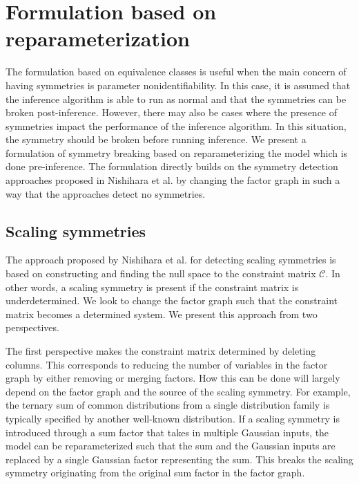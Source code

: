

\section{Formulation based on reparameterization}

The formulation based on equivalence classes is useful when the main concern of having symmetries is parameter nonidentifiability. In this case, it is assumed that the inference algorithm is able to run as normal and that the symmetries can be broken post-inference. However, there may also be cases where the presence of symmetries impact the performance of the inference algorithm. In this situation, the symmetry should be broken before running inference. We present a formulation of symmetry breaking based on reparameterizing the model which is done pre-inference. The formulation directly builds on the symmetry detection approaches proposed in Nishihara et al. by changing the factor graph in such a way that the approaches detect no symmetries.


\subsection{Scaling symmetries}

The approach proposed by Nishihara et al. for detecting scaling symmetries is based on constructing and finding the null space to the constraint matrix $\mathcal{C}$. In other words, a scaling symmetry is present if the constraint matrix is underdetermined. We look to change the factor graph such that the constraint matrix becomes a determined system. We present this approach from two perspectives. 

The first perspective makes the constraint matrix determined by deleting columns. This corresponds to reducing the number of variables in the factor graph by either removing or merging factors. How this can be done will largely depend on the factor graph and the source of the scaling symmetry. For example, the ternary sum of common distributions from a single distribution family is typically specified by another well-known distribution. If a scaling symmetry is introduced through a sum factor that takes in multiple Gaussian inputs, the model can be reparameterized such that the sum and the Gaussian inputs are replaced by a single Gaussian factor representing the sum. This breaks the scaling symmetry originating from the original sum factor in the factor graph.

